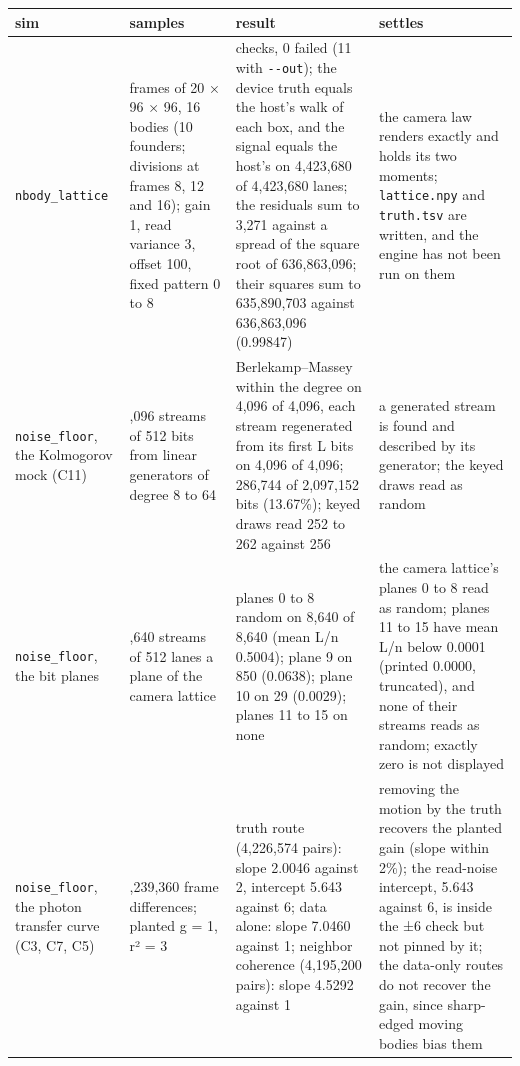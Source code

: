 {\footnotesize
\setlength{\tabcolsep}{6pt}
\begin{longtable}{>{\RaggedRight\arraybackslash}p{}>{\RaggedRight\arraybackslash}p{}>{\RaggedRight\arraybackslash}p{}>{\RaggedRight\arraybackslash}p{}}
\toprule
sim & samples & result & settles \\
\midrule
\endhead
\texttt{nbody\_\allowbreak{}lattice} & 24 frames of 20 × 96 × 96, 16 bodies (10 founders; divisions at frames 8, 12 and 16); gain 1, read variance 3, offset 100, fixed pattern 0 to 8 & 9 checks, 0 failed (11 with \texttt{-\allowbreak{}-\allowbreak{}out}); the device truth equals the host's walk of each box, and the signal equals the host's on 4,423,680 of 4,423,680 lanes; the residuals sum to 3,271 against a spread of the square root of 636,863,096; their squares sum to 635,890,703 against 636,863,096 (0.99847) & the camera law renders exactly and holds its two moments; \texttt{lattice.\allowbreak{}npy} and \texttt{truth.\allowbreak{}tsv} are written, and the engine has not been run on them \\
\texttt{noise\_\allowbreak{}floor}, the Kolmogorov mock (C11) & 4,096 streams of 512 bits from linear generators of degree 8 to 64 & Berlekamp–Massey within the degree on 4,096 of 4,096, each stream regenerated from its first L bits on 4,096 of 4,096; 286,744 of 2,097,152 bits (13.67\%); keyed draws read 252 to 262 against 256 & a generated stream is found and described by its generator; the keyed draws read as random \\
\texttt{noise\_\allowbreak{}floor}, the bit planes & 8,640 streams of 512 lanes a plane of the camera lattice & planes 0 to 8 random on 8,640 of 8,640 (mean L/n 0.5004); plane 9 on 850 (0.0638); plane 10 on 29 (0.0029); planes 11 to 15 on none & the camera lattice's planes 0 to 8 read as random; planes 11 to 15 have mean L/n below 0.0001 (printed 0.0000, truncated), and none of their streams reads as random; exactly zero is not displayed \\
\texttt{noise\_\allowbreak{}floor}, the photon transfer curve (C3, C7, C5) & 4,239,360 frame differences; planted g = 1, r² = 3 & truth route (4,226,574 pairs): slope 2.0046 against 2, intercept 5.643 against 6; data alone: slope 7.0460 against 1; neighbor coherence (4,195,200 pairs): slope 4.5292 against 1 & removing the motion by the truth recovers the planted gain (slope within 2\%); the read-noise intercept, 5.643 against 6, is inside the ±6 check but not pinned by it; the data-only routes do not recover the gain, since sharp-edged moving bodies bias them \\

\end{longtable}}
